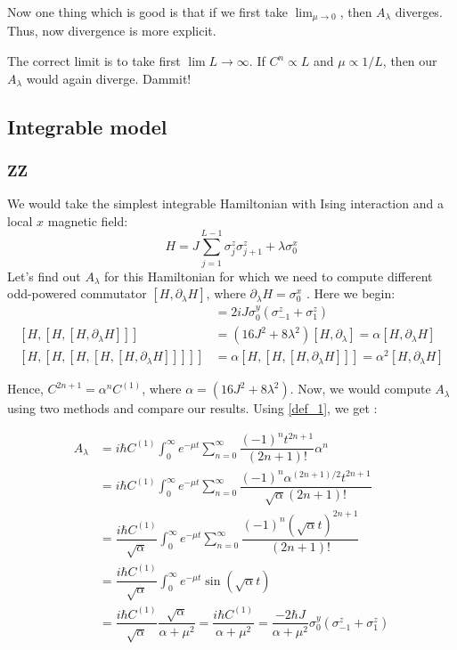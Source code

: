 \documentclass[11pt,a4paper]{article}
\begin{document}
Now one thing which is good is that if we first take $\lim_{\mu \rightarrow 0}$, then $A_{\lambda}$ diverges. Thus, now divergence is more explicit. 

The correct limit is to take first $\lim L \rightarrow \infty$. If $C^n \propto L$ and $\mu \propto 1/L$, then our $A_{\lambda}$ would again diverge. Dammit!

\subsection{ Integrable model}

\subsubsection*{ZZ}
We would take the simplest integrable Hamiltonian with Ising interaction and a local $x$ magnetic field:
\begin{equation}
H= J \sum_{j=1}^{L-1}  \sigma_j^z \sigma_{j+1}^z +  \lambda  \sigma_0^x
\label{zz}
\end{equation}
Let's find out $A_{\lambda}$ for this Hamiltonian for which we need to compute different odd-powered commutator $[H, \partial_{\lambda} H]$, where $\partial_{\lambda} H=\sigma_0^x$ . Here we begin:
\begin{align*}
[H, \partial_{\lambda} H] &= 2 i J \sigma_0^y ( \sigma_{-1}^z + \sigma_1^z) \\ %
[H, [H,[H, \partial_{\lambda} H]]] &=  (16 J^2 + 8 \lambda ^2) [H, \partial_{\lambda} ] = \alpha  [H, \partial_{\lambda} H] \\
[H, [H,[H, [H,[H, \partial_{\lambda} H]]]]] &= \alpha [H, [H,[H, \partial_{\lambda} H]]]=  \alpha^2  [H, \partial_{\lambda}H ] 
\end{align*}


Hence, $C^{2n+1}= \alpha^n C^{(1)}$, where $\alpha= (16 J^2 + 8 \lambda ^2) $. Now, we would compute $A_{\lambda}$ using two methods and compare our results. Using \ref{def_1}, we get :

\begin{align*}
A_{\lambda} &= i\hbar   C^{(1)} \int_0^{\infty} e^{-\mu t} \sum_{n=0}^{\infty} \dfrac{(-1)^{n} t ^{2n+1}}{(2n+1)!}  \alpha^n  \\
 &= i\hbar   C^{(1)} \int_0^{\infty} e^{-\mu t} \sum_{n=0}^{\infty} \dfrac{(-1)^{n}  \alpha^{(2n+1)/2} t ^{2n+1}}{\sqrt{\alpha}(2n+1)!}   \\
  &= \dfrac{i\hbar   C^{(1)}}{\sqrt{\alpha}} \int_0^{\infty} e^{-\mu t} \sum_{n=0}^{\infty} \dfrac{(-1)^{n}  (\sqrt{\alpha } t)^{2n+1}}{(2n+1)!}   \\
    &= \dfrac{i\hbar   C^{(1)}}{\sqrt{\alpha}} \int_0^{\infty} e^{-\mu t}  \sin  (\sqrt{\alpha } t)   \\
     &= \dfrac{i\hbar   C^{(1)}}{\sqrt{\alpha}} \dfrac{\sqrt{\alpha}}{\alpha + \mu^2} =\dfrac{i\hbar   C^{(1)}}{{\alpha + \mu^2}} =  \dfrac{-2 \hbar J}{{\alpha + \mu^2}} \sigma_0^y ( \sigma_{-1}^z + \sigma_1^z) 
\end{align*}
 
\end{document}
